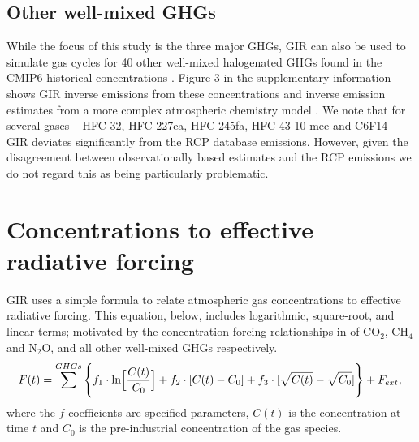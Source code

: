 \documentclass[gmd, manuscript]{copernicus}
\begin{document}
\subsection*{Other well-mixed GHGs}
While the focus of this study is the three major GHGs, GIR can also be used to simulate gas cycles for 40 other well-mixed halogenated GHGs found in the CMIP6 historical concentrations \citep{Meinshausen2017}. Figure 3 in the supplementary information shows GIR inverse emissions from these concentrations and inverse emission estimates from a more complex atmospheric chemistry model \citep{Cunnold1994,Rigby2011,Rigby2014,Engel2018,Prinn2018}. We note that for several gases -- HFC-32, HFC-227ea, HFC-245fa, HFC-43-10-mee and C6F14 -- GIR deviates significantly from the RCP database emissions. However, given the disagreement between observationally based estimates \citep{Vollmer2011,Ivy2012,Odoherty2014} and the RCP emissions we do not regard this as being particularly problematic.

\section{Concentrations to effective radiative forcing}
GIR uses a simple formula to relate atmospheric gas concentrations to effective radiative forcing. This equation, below, includes logarithmic, square-root, and linear terms; motivated by the concentration-forcing relationships in \cite{Myhre2013a} of CO$_2$, CH$_4$ and N$_2$O, and all other well-mixed GHGs respectively.
\begin{equation}
    F(t) = \sum^{GHGs} \Bigg\{ f_1 \cdot \text{ln}\Big[\frac{C(t)}{C_0}\Big] + f_2 \cdot [C(t) - C_0] + f_3 \cdot[\sqrt{C(t)} - \sqrt{C_0}] \Bigg\} + F_{ext}, \label{eq_forc}\\
\end{equation}
where the $f$ coefficients are specified parameters, $C(t)$ is the concentration at time $t$ and $C_0$ is the pre-industrial concentration of the gas species.
\end{document}

